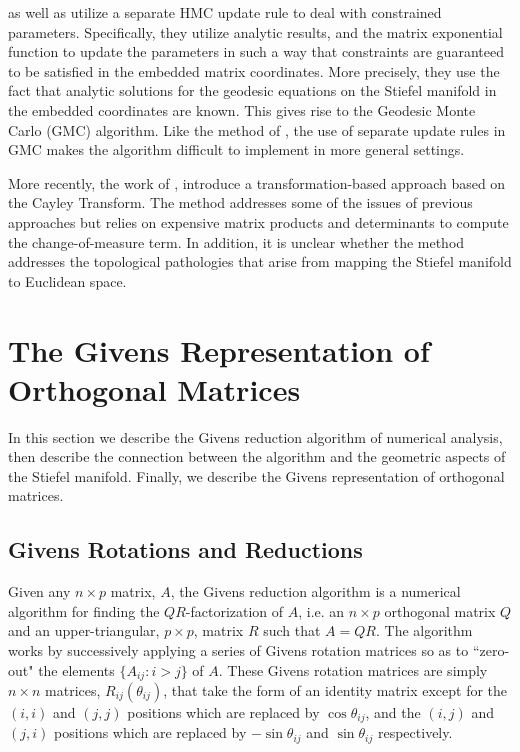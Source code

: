 \documentclass[ba]{imsart}
\numberwithin{equation}{section}
\theoremstyle{plain}
\begin{document}
\noindent \citet{byrne2013geodesic} as well as \citet{holbrook2016bayesian} utilize a separate HMC update rule to deal with constrained parameters. Specifically, they utilize analytic results, and the matrix exponential function to update the parameters in such a way that constraints are guaranteed to be satisfied in the embedded matrix coordinates. More precisely, they use the fact that analytic solutions for the geodesic equations on the Stiefel manifold in the embedded coordinates are known. This gives rise to the Geodesic Monte Carlo (GMC) algorithm. Like the method of \cite{brubaker2012family}, the use of separate update rules in GMC makes the algorithm difficult to implement in more general settings.

\noindent More recently, the work of \cite{jauch2018random}, introduce a transformation-based approach based on the Cayley Transform. The method addresses some of the issues of previous approaches but relies on expensive matrix products and determinants to compute the change-of-measure term. In addition, it is unclear whether the method addresses the topological pathologies that arise from mapping the Stiefel manifold to Euclidean space.

\section{The Givens Representation of Orthogonal Matrices} \label{Givens}
In this section we describe the Givens reduction algorithm of numerical analysis, then describe the connection between the algorithm and the geometric aspects of the Stiefel manifold. Finally, we describe the Givens representation of orthogonal matrices.

\subsection{Givens Rotations and Reductions} \label{givens_reduction}
Given any $n \times p$ matrix, $A$, the Givens reduction algorithm is a numerical algorithm for finding the $QR$-factorization of $A$, i.e. an $n\times p$ orthogonal matrix $Q$ and an upper-triangular, $p \times p$, matrix $R$ such that $A = QR$. The algorithm works by successively applying a series of Givens rotation matrices so as to ``zero-out" the elements $\{A_{ij} : i > j \}$ of $A$. These Givens rotation matrices are simply $n \times n$ matrices, $R_{ij}(\theta_{ij})$, that take the form of an identity matrix except for the $(i,i)$ and $(j,j)$ positions which are replaced by $\cos \theta_{ij}$, and the $(i,j)$ and $(j,i)$ positions which are replaced by $-\sin \theta_{ij}$ and $\sin \theta_{ij}$ respectively.
\end{document}
